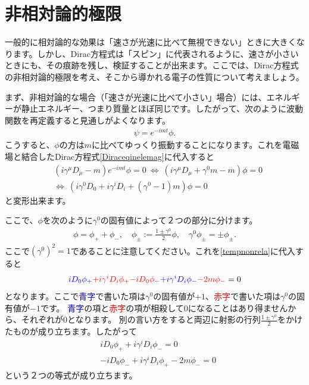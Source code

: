 \documentclass[report,paper=a4, fontsize=12pt, line_length=16cm, number_of_lines=33,dvipdfmx]{jlreq}
\numberwithin{equation}{chapter}
\newcommand{\ao}[1]{\textcolor{blue}{#1}}
\newcommand{\aka}[1]{\textcolor{red}{#1}}
\begin{document}
\section{非相対論的極限}
一般的に相対論的な効果は「速さが光速に比べて無視できない」ときに大きくなります。しかし、Dirac方程式は「スピン」に代表されるように、速さが小さいときにも、その痕跡を残し、検証することが出来ます。ここでは、Dirac方程式の非相対論的極限を考え、そこから導かれる電子の性質について考えましょう。

まず、非相対論的な場合（「速さが光速に比べて小さい」場合）には、エネルギーが静止エネルギー、つまり質量とほぼ同じです。したがって、次のように波動関数を再定義すると見通しがよくなります。
\begin{align}
  \psi=e^{-imt}\phi.
\end{align}
こうすると、$\phi$の方は$m$に比べてゆっくり振動することになります。これを電磁場と結合したDirac方程式\eqref{Diraceqinelemag}に代入すると
\begin{align}
  &(i\gamma^{\mu}D_{\mu}-m)e^{-imt}\phi=0
  \ \Leftrightarrow \ 
  (i\gamma^{\mu}D_{\mu}+\gamma^{0}m-m)\phi=0\\
  &\Leftrightarrow \ 
  (i\gamma^{0}D_{0}+i\gamma^{i}D_{i}+(\gamma^{0}-1)m)\phi=0\label{tempnonrela}
\end{align}
と変形出来ます。

ここで、$\phi$を次のように$\gamma^0$の固有値によって２つの部分に分けます。
\begin{align}
  \phi=\phi_{+}+\phi_{-},\quad \phi_{\pm}:=\frac{1\pm \gamma^0}{2} \phi,\quad \gamma^{0}\phi_{\pm}=\pm \phi_{\pm}.
\end{align}
ここで$(\gamma^{0})^2=1$であることに注意してください。これを\eqref{tempnonrela}に代入すると
\begin{align}
  \ao{iD_0\phi_{+}}
  \aka{+i\gamma^{i}D_{i}\phi_{+}}
  \aka{-iD_0\phi_{-}}\ao{+i\gamma^{i}D_{i}\phi_{-}}
  \aka{-2m \phi_{-}}=0
\end{align}
となります。ここで\ao{青字}で書いた項は$\gamma^0$の固有値が$+1$、\aka{赤字}で書いた項は$\gamma^{0}$の固有値が$-1$です。
\ao{青字}の項と\aka{赤字}の項が相殺して$0$になることはあり得ませんから、それぞれが$0$となります。
別の言い方をすると両辺に射影の行列$\frac{1\pm \gamma^{0}}{2}$をかけたものが成り立ちます。したがって
\begin{align}
  &iD_{0}\phi_{+}+i\gamma^{i}D_{i}\phi_{-}=0
  \label{tempnonrelaphi+}\\
  &-iD_{0}\phi_{-}+i\gamma^{i}D_{i}\phi_{+}-2m\phi_{-}=0
  \label{tempnonrelaphi-}
\end{align}
という２つの等式が成り立ちます。
\end{document}
